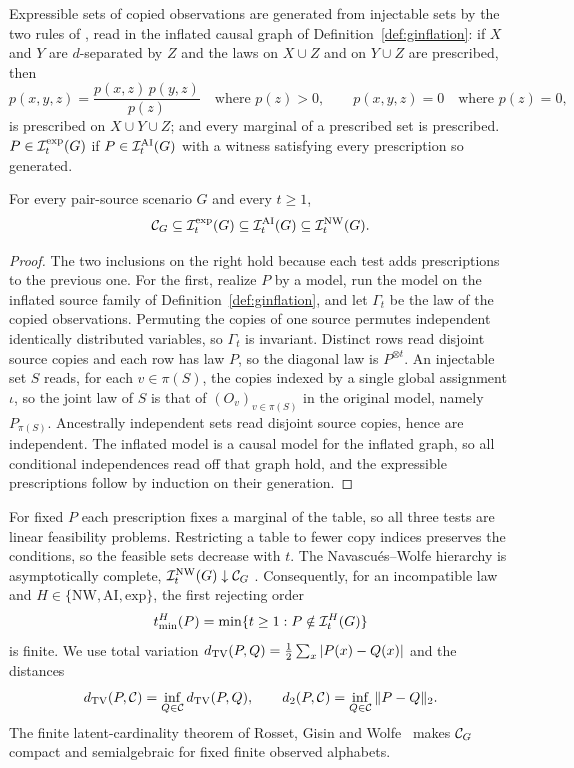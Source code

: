 \begin{definition}\label{def:gexp}\label{def:exp}
Expressible sets of copied observations are generated from injectable sets by the two rules of \cite[Definition~7]{WSF2019}, read in the inflated causal graph of Definition~\ref{def:ginflation}: if $X$ and $Y$ are $d$-separated by $Z$ and the laws on $X\cup Z$ and on $Y\cup Z$ are prescribed, then
\[
p(x,y,z)=\frac{p(x,z)\,p(y,z)}{p(z)}\quad\text{where }p(z)>0,\qquad p(x,y,z)=0\quad\text{where }p(z)=0,
\]
is prescribed on $X\cup Y\cup Z$; and every marginal of a prescribed set is prescribed. $P\in\mathcal I^{\mathrm{exp}}_t(G)$ if $P\in\mathcal I^{\mathrm{AI}}_t(G)$ with a witness satisfying every prescription so generated.
\end{definition}

\begin{proposition}[Soundness]\label{prop:gsound}
For every pair-source scenario $G$ and every $t\ge1$,
\begin{equation}\label{eq:nested}
\mathcal C_{G}\subseteq\mathcal I^{\mathrm{exp}}_t(G)\subseteq\mathcal I^{\mathrm{AI}}_t(G)\subseteq\mathcal I^{\mathrm{NW}}_t(G).
\end{equation}
\end{proposition}

\begin{proof}
The two inclusions on the right hold because each test adds prescriptions to the previous one. For the first, realize $P$ by a model, run the model on the inflated source family of Definition~\ref{def:ginflation}, and let $\Gamma_t$ be the law of the copied observations. Permuting the copies of one source permutes independent identically distributed variables, so $\Gamma_t$ is invariant. Distinct rows read disjoint source copies and each row has law $P$, so the diagonal law is $P^{\otimes t}$. An injectable set $S$ reads, for each $v\in\pi(S)$, the copies indexed by a single global assignment $\iota$, so the joint law of $S$ is that of $(O_v)_{v\in\pi(S)}$ in the original model, namely $P_{\pi(S)}$. Ancestrally independent sets read disjoint source copies, hence are independent. The inflated model is a causal model for the inflated graph, so all conditional independences read off that graph hold, and the expressible prescriptions follow by induction on their generation.
\end{proof}


For fixed $P$ each prescription fixes a marginal of the table, so all three tests are linear feasibility problems. Restricting a table to fewer copy indices preserves the conditions, so the feasible sets decrease with $t$. The Navascués--Wolfe hierarchy is asymptotically complete, $\mathcal I^{\mathrm{NW}}_t(G)\downarrow\mathcal C_{G}$ \cite{NW2020}. Consequently, for an incompatible law and $H\in\{\mathrm{NW},\mathrm{AI},\mathrm{exp}\}$, the first rejecting order
\[
t_{\min}^H(P)=\min\{t\ge1:P\notin\mathcal I_t^H(G)\}
\]
is finite. We use total variation $d_{\operatorname{TV}}(P,Q)=\tfrac12\sum_x|P(x)-Q(x)|$ and the distances
\[
d_{\operatorname{TV}}(P,\mathcal C)=\inf_{Q\in\mathcal C}d_{\operatorname{TV}}(P,Q),\qquad
d_2(P,\mathcal C)=\inf_{Q\in\mathcal C}\|P-Q\|_2.
\]
The finite latent-cardinality theorem of Rosset, Gisin and Wolfe~\cite{RGW2018} makes $\mathcal C_{G}$ compact and semialgebraic for fixed finite observed alphabets.


